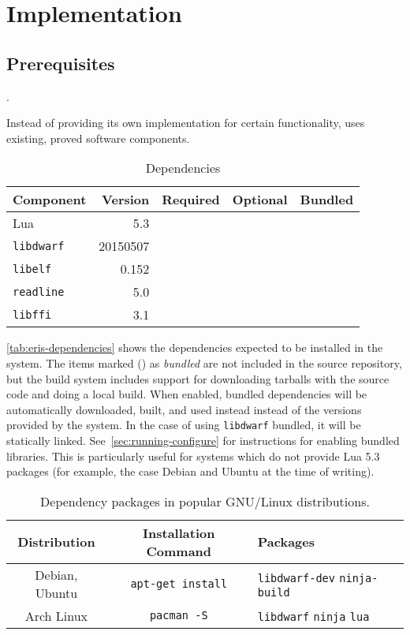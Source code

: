 
\chapter{Implementation}

\section{Prerequisites}

.

Instead of providing its own implementation for certain functionality, \Eris*
uses existing, proved software components.

\begin{table}[h]
	\centering
	\begin{tabular}{lrccc}
		\toprule
		Component & Version  & Required & Optional & Bundled \\
		\midrule
		Lua             & 5.3      & \Tick &       & \Tick \\
		\verb|libdwarf| & 20150507 & \Tick &       & \Tick \\
		\verb|libelf|   & 0.152    & \Tick &       & \\
		\verb|readline| & 5.0      &       & \Tick & \\
		\verb|libffi|   & 3.1      & \Tick &       & \\
		\bottomrule
	\end{tabular}
	\caption{Dependencies}
	\label{tab:eris-dependencies}
\end{table}

\autoref{tab:eris-dependencies} shows the dependencies expected to be
installed in the system. The items marked (\inlinesymbol\Tick) as
\emph{bundled} are not included in the source repository, but the build system
includes support for downloading tarballs with the source code and doing
a local build. When enabled, bundled dependencies will be automatically
downloaded, built, and used instead instead of the versions provided by the
system. In the case of using \verb|libdwarf| bundled, it will be statically
linked. See~\autoref{sec:running-configure} for instructions for enabling
bundled libraries. This is particularly useful for systems which do not
provide Lua 5.3 packages (for example, the case Debian and Ubuntu at the time
of writing).

\begin{table}
  \begin{tabular}{ccp{}}
  \toprule
	Distribution & Installation Command & Packages \\
	\midrule
	Debian, Ubuntu &
    \verb|apt-get install| &
    \verb|libdwarf-dev| \verb|ninja-build| \\
	Arch Linux & \verb|pacman -S| & \verb|libdwarf| \verb|ninja| \verb|lua| \\
	\bottomrule
  \end{tabular}
  \caption{Dependency packages in popular GNU/Linux distributions.}
  \label{tab:distro-dependency-packages}
\end{table}

